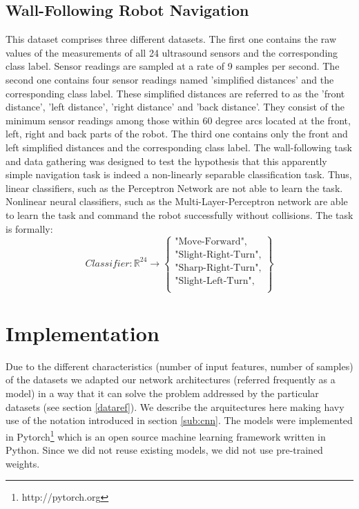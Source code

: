 \documentclass[a4paper, 11pt, twoside, openright]{article}
\begin{document}
\subsection{Wall-Following Robot Navigation} \label{sub:wfrn}

This dataset comprises three different datasets.
The first one contains the raw values of the measurements of all 24 ultrasound sensors and the corresponding class label. Sensor readings are sampled at a rate of 9 samples per second.
The second one contains four sensor readings named 'simplified distances' and the corresponding class label. These simplified distances are referred to as the 'front distance', 'left distance', 'right distance' and 'back distance'. They consist of the minimum sensor readings among those within 60 degree arcs located at the front, left, right and back parts of the robot.
The third one contains only the front and left simplified distances and the corresponding class label.
The wall-following task and data gathering was designed to test the hypothesis that this apparently simple navigation task is indeed a non-linearly separable classification task. Thus, linear classifiers, such as the Perceptron Network are not able to learn the task. Nonlinear neural classifiers, such as the Multi-Layer-Perceptron network are able to learn the task and command the robot successfully without collisions. The task is formally:
\begin{equation}
Classifier \colon \mathbb{R}^{24} \to
\begin{Bmatrix}
\text{"Move-Forward",}\\
\text{"Slight-Right-Turn",}\\
\text{"Sharp-Right-Turn",}\\
\text{"Slight-Left-Turn",}\\
\end{Bmatrix}
\end{equation}

\section{Implementation} \label{implref}

Due to the different characteristics (number of input features, number of samples) of the datasets we adapted our network architectures (referred frequently as a model) in a way that it can solve the problem addressed by the particular datasets (see section \ref{dataref}). We describe the arquitectures here making havy use of the notation introduced in section \ref{sub:cnn}. The models were implemented in Pytorch\footnote{http://pytorch.org} which is an open source machine learning framework written in Python. Since we did not reuse existing models, we did not use pre-trained weights.
\end{document}
